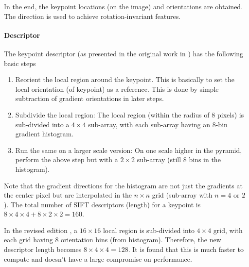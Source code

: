 In the end, the keypoint locations (on the image) and orientations are obtained. The direction is used to achieve rotation-invariant features.

\paragraph*{Descriptor}

The keypoint descriptor (as presented in the original work in \cite{sift-original-lowe}) has the following basic steps

\begin{enumerate}
    \item Reorient the local region around the keypoint. This is basically to set the local orientation (of keypoint) as a reference. This is done by simple subtraction of gradient orientations in later steps.
    \item Subdivide the local region: The local region (within the radius of $8$ pixels) is sub-divided into a $4 \times 4$ sub-array, with each sub-array having an 8-bin gradient histogram.
    \item Run the same on a larger scale version: On one scale higher in the pyramid, perform the above step but with a $2 \times 2$ sub-array (still $8$ bins in the histogram).
\end{enumerate}

Note that the gradient directions for the histogram are not just the gradients at the center pixel but are interpolated in the $n \times n$ grid (sub-array with $n=4 $ or $2$). The total number of SIFT descriptors (length) for a keypoint is $8 \times 4 \times 4 + 8 \times 2 \times 2 = 160$. 

In the revised edition \cite{sift-detailed-lowe}, a $16 \times 16$ local region is sub-divided into $4\times 4$ grid, with each grid having $8$ orientation bins (from histogram). Therefore, the new descriptor length becomes $8 \times 4 \times 4 = 128$. It is found that this is much faster to compute and doesn't have a large compromise on performance.
